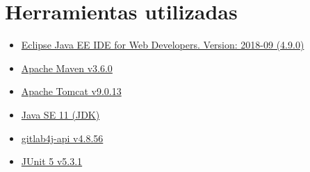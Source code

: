 

\section{Herramientas utilizadas}

\begin{itemize}
	\item \href{https://www.eclipse.org/}{Eclipse Java EE IDE for Web Developers. Version: 2018-09 (4.9.0)}
	\item \href{https://maven.apache.org/}{Apache Maven v3.6.0}
	\item \href{http://tomcat.apache.org/}{Apache Tomcat v9.0.13}
	\item \href{https://www.oracle.com/technetwork/java/javase/overview/index.html}{Java SE 11 (JDK)}
	\item \href{https://github.com/gmessner/gitlab4j-api}{gitlab4j-api v4.8.56}
	\item \href{https://junit.org/junit5/}{JUnit 5 v5.3.1}
\end{itemize}
